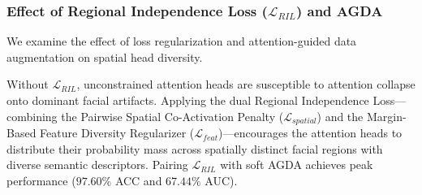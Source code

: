 \subsubsection{Effect of Regional Independence Loss ($\mathcal{L}_{RIL}$) and AGDA}
We examine the effect of loss regularization and attention-guided data augmentation on spatial head diversity.

\begin{table}[ht]
    \centering
    \caption{Impact of Loss Constraints and AGDA on Detection Performance ($\text{Mean} \pm \text{Std Dev}$).}
    \label{tab:ablation_agda}
    \par{}
\end{table}

Without $\mathcal{L}_{RIL}$, unconstrained attention heads are susceptible to attention collapse onto dominant facial artifacts. Applying the dual Regional Independence Loss—combining the Pairwise Spatial Co-Activation Penalty ($\mathcal{L}_{spatial}$) and the Margin-Based Feature Diversity Regularizer ($\mathcal{L}_{feat}$)—encourages the attention heads to distribute their probability mass across spatially distinct facial regions with diverse semantic descriptors. Pairing $\mathcal{L}_{RIL}$ with soft AGDA achieves peak performance ($97.60\%$ ACC and $67.44\%$ AUC).

